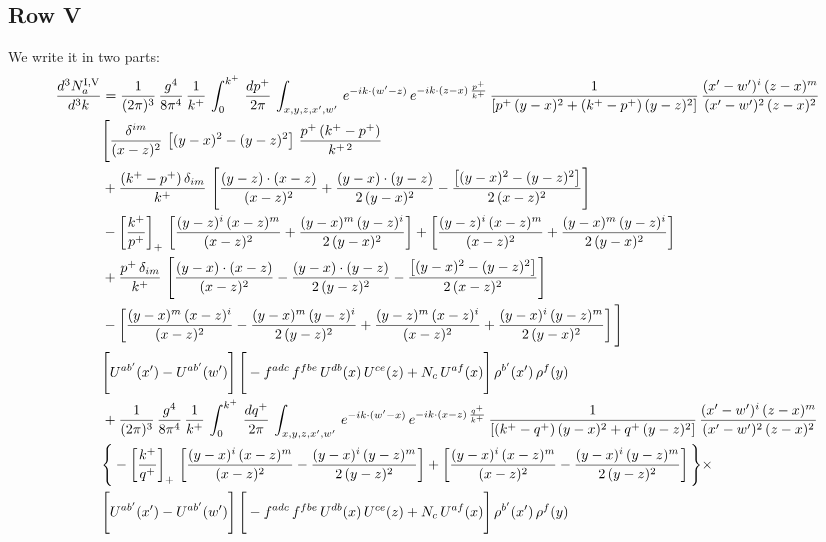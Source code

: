 \documentclass[9pt]{article}
\numberwithin{equation}{section}
\begin{document}
\subsection{Row V}
We write it in two parts: 
\begin{align}
    \frac{d^{3}N^{\rm I,V}_{a}}{d^{3}k}  & =  \frac{1}{(2\pi)^{3}}\, \frac{g^{4}}{8\pi^{4}}\,\frac{1}{k^{+}}\,\int_{0}^{k^{+}}\, \frac{dp^{+}}{2\pi}\,\int_{x,y,z,x',w'}\, e^{-ik\cdot(w'-z)}\,e^{-ik\cdot (z-x)\,\frac{p^{+}}{k^{+}}}\,\frac{1}{\left[p^{+}\,(y-x)^{2}+(k^{+}-p^{+})\,(y-z)^{2}\right]}\, \frac{(x'-w')^{i}\,(z-x)^{m}}{(x'-w')^{2}\,(z-x)^{2}} \notag \\ & \Bigg[\frac{\delta^{im}}{(x-z)^{2}}\,\left[(y-x)^{2}-(y-z)^{2}\right]\,\frac{p^{+}\,(k^{+}-p^{+})}{k^{+\,2}}\notag \\ & +\frac{(k^{+}-p^{+})\,\delta_{im}}{k^{+}}\,\left[\frac{(y-z)\cdot (x-z)}{(x-z)^{2}}+\frac{(y-x)\cdot (y-z)}{2\,(y-x)^{2}}-\frac{\left[(y-x)^{2}-(y-z)^{2}\right]}{2\,(x-z)^{2}}\right]\notag \\ & -\left[\frac{k^{+}}{p^{+}}\right]_{+}\,\left[\frac{(y-z)^{i}\,(x-z)^{m}}{(x-z)^{2}}+\frac{(y-x)^{m}\,(y-z)^{i}}{2\,(y-x)^{2}}\right]+ \left[\frac{(y-z)^{i}\,(x-z)^{m}}{(x-z)^{2}}+\frac{(y-x)^{m}\,(y-z)^{i}}{2\,(y-x)^{2}}\right]\notag \\ & +\frac{p^{+}\,\delta_{im}}{k^{+}}\,\left[\frac{(y-x)\cdot (x-z)}{(x-z)^{2}}-\frac{(y-x)\cdot (y-z)}{2\,(y-z)^{2}}-\frac{\left[(y-x)^{2}-(y-z)^{2}\right]}{2\,(x-z)^{2}}\right]\notag \\ &-\left[\frac{(y-x)^{m}\,(x-z)^{i}}{(x-z)^{2}}-\frac{(y-x)^{m}\,(y-z)^{i}}{2\,(y-z)^{2}}+\frac{(y-z)^{m}\,(x-z)^{i}}{(x-z)^{2}}+\frac{(y-x)^{i}\,(y-z)^{m}}{2\,(y-x)^{2}}\right]\Bigg] \notag \\ & \Bigg[U^{ab'}(x')-U^{ab'}(w')\Bigg]\,\Bigg[-f^{adc}\,f^{fbe}\,U^{db}(x)\,U^{ce}(z)+N_{c}\,U^{af}(x)\Bigg]\,\rho^{b'}(x')\,\rho^{f}(y)\notag \\ & + \frac{1}{(2\pi)^{3}}\,\frac{g^{4}}{8\pi^{4}}\,\frac{1}{k^{+}}\, \int_{0}^{k^{+}}\, \frac{dq^{+}}{2\pi} \,  \int_{x,y,z,x',w'}\,e^{-ik\cdot(w'-x)}\,e^{-ik\cdot (x-z)\,\frac{q^{+}}{k^{+}}}\,\frac{1}{\left[(k^{+}-q^{+})\,(y-x)^{2}+q^{+}\,(y-z)^{2}\right]}\, \frac{(x'-w')^{i}\,(z-x)^{m}}{(x'-w')^{2}\,(z-x)^{2}} \notag \\ &\Bigg\{-\left[\frac{k^{+}}{q^{+}}\right]_{+}\,\left[\frac{(y-x)^{i}\,(x-z)^{m}}{(x-z)^{2}}-\frac{(y-x)^{i}\,(y-z)^{m}}{2\,(y-z)^{2}}\right] +\left[\frac{(y-x)^{i}\,(x-z)^{m}}{(x-z)^{2}}-\frac{(y-x)^{i}\,(y-z)^{m}}{2\,(y-z)^{2}}\right]\Bigg\}\times\,\notag \\ & \Bigg[U^{ab'}(x')-U^{ab'}(w')\Bigg]\,\Bigg[-f^{adc}\,f^{fbe}\,U^{db}(x)\,U^{ce}(z)+N_{c}\,U^{af}(x)\Bigg]\,\rho^{b'}(x')\,\rho^{f}(y)
\end{align} 
\end{document}

